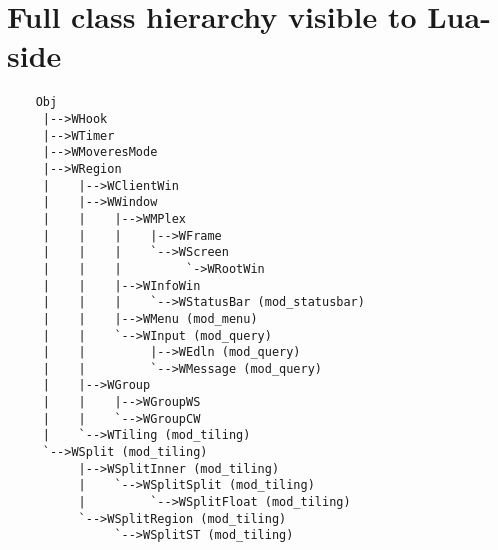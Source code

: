 \chapter{Full class hierarchy visible to Lua-side}
\label{app:fullhierarchy}
  
{\small
\begin{verbatim}
    Obj
     |-->WHook
     |-->WTimer
     |-->WMoveresMode
     |-->WRegion
     |    |-->WClientWin
     |    |-->WWindow
     |    |    |-->WMPlex
     |    |    |    |-->WFrame
     |    |    |    `-->WScreen
     |    |    |         `->WRootWin
     |    |    |-->WInfoWin
     |    |    |    `-->WStatusBar (mod_statusbar)
     |    |    |-->WMenu (mod_menu)
     |    |    `-->WInput (mod_query)
     |    |         |-->WEdln (mod_query)
     |    |         `-->WMessage (mod_query)
     |    |-->WGroup
     |    |    |-->WGroupWS
     |    |    `-->WGroupCW
     |    `-->WTiling (mod_tiling)
     `-->WSplit (mod_tiling)
          |-->WSplitInner (mod_tiling)
          |    `-->WSplitSplit (mod_tiling)
          |         `-->WSplitFloat (mod_tiling)
          `-->WSplitRegion (mod_tiling)
               `-->WSplitST (mod_tiling)
\end{verbatim}
}
